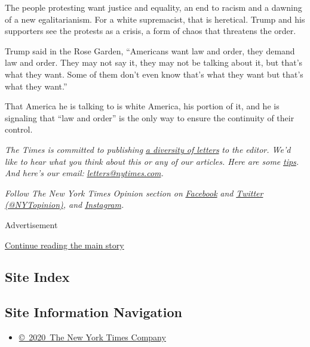 The people protesting want justice and equality, an end to racism and a
dawning of a new egalitarianism. For a white supremacist, that is
heretical. Trump and his supporters see the protests as a crisis, a form
of chaos that threatens the order.

Trump said in the Rose Garden, ``Americans want law and order, they
demand law and order. They may not say it, they may not be talking about
it, but that's what they want. Some of them don't even know that's what
they want but that's what they want.''

That America he is talking to is white America, his portion of it, and
he is signaling that ``law and order'' is the only way to ensure the
continuity of their control.

\emph{The Times is committed to publishing}
\href{https://www.nytimes.com/2019/01/31/opinion/letters/letters-to-editor-new-york-times-women.html}{\emph{a
diversity of letters}} \emph{to the editor. We'd like to hear what you
think about this or any of our articles. Here are some}
\href{https://help.nytimes.com/hc/en-us/articles/115014925288-How-to-submit-a-letter-to-the-editor}{\emph{tips}}\emph{.
And here's our email:}
\href{mailto:letters@nytimes.com}{\emph{letters@nytimes.com}}\emph{.}

\emph{Follow The New York Times Opinion section on}
\href{https://www.facebook.com/nytopinion}{\emph{Facebook}} \emph{and}
\href{http://twitter.com/NYTOpinion}{\emph{Twitter
(@NYTopinion)}}\emph{, and}
\href{https://www.instagram.com/nytopinion/}{\emph{Instagram}}\emph{.}

Advertisement

\protect\hyperlink{after-bottom}{Continue reading the main story}

\hypertarget{site-index}{%
\subsection{Site Index}\label{site-index}}

\hypertarget{site-information-navigation}{%
\subsection{Site Information
Navigation}\label{site-information-navigation}}

\begin{itemize}
\tightlist
\item
  \href{https://help.nytimes.com/hc/en-us/articles/115014792127-Copyright-notice}{©~2020~The
  New York Times Company}
\end{itemize}

